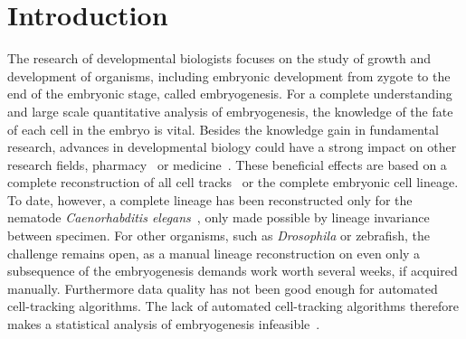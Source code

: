 \chapter{Introduction}
\label{cha:introduction}

The research of developmental biologists focuses on the study of growth and development of
organisms, including embryonic development from zygote to the end of the embryonic stage, called
embryogenesis. For a complete understanding and large scale quantitative analysis of embryogenesis,
the knowledge of the fate of each cell in the embryo is vital. Besides the knowledge gain in
fundamental research, advances in developmental biology could have a strong impact on other
research fields, \eg pharmacy~\citep{kunz_04_use} or
medicine~\citep{kari_07_zebrafish,chakraborty_09_zebrafish}. These beneficial effects are based on a
complete reconstruction of all cell tracks~\citep{miura_05_tracking} or the complete embryonic cell
lineage. To date, however, a complete lineage has been reconstructed only for the nematode
\emph{Caenorhabditis elegans}~\citep{sulston_83_embryonic}, only made possible by lineage invariance
between specimen. For other organisms, such as \emph{Drosophila} or zebrafish, the challenge remains
open, as a manual lineage reconstruction on even only a subsequence of the embryogenesis demands
work worth several weeks, if acquired manually. Furthermore data quality has not been good enough
for automated cell-tracking algorithms. The lack of automated cell-tracking algorithms therefore
makes a statistical analysis of embryogenesis infeasible~\citep{meijering_09_tracking}.

